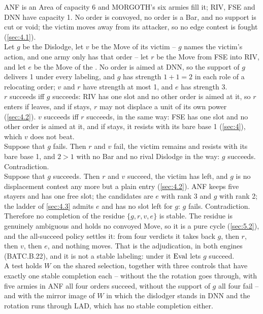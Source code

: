 \documentclass[12pt,a4paper]{article}
\begin{document}
ANF is an Area of capacity 6 and MORGOTH's six armies fill it; RIV, FSE and DNN have capacity 1.
No order is convoyed, no order is a Bar, and no support is cut or void; the victim moves away from its attacker, so no edge contest is fought (\cref{sec:4.1}).\\
Let $g$ be the Dislodge, let $v$ be the Move of its victim -- $g$ names the victim's action, and one army only has that order -- let $r$ be the Move from FSE into RIV, and let $e$ be the Move of the .
No order is aimed at DNN, so the support of $g$ delivers 1 under every labeling, and $g$ has strength $1 + 1 = 2$ in each role of a relocating order; $v$ and $r$ have strength at most 1, and $e$ has strength 3.\\
$r$ succeeds iff $g$ succeeds: RIV has one slot and no other order is aimed at it, so $r$ enters if  leaves, and if  stays, $r$ may not displace a unit of its own power (\cref{sec:4.2}).
$v$ succeeds iff $r$ succeeds, in the same way: FSE has one slot and no other order is aimed at it, and if  stays, it resists with its bare base 1 (\cref{sec:4}), which $v$ does not beat.\\
Suppose that $g$ fails.
Then $r$ and $v$ fail, the victim remains and resists with its bare base 1, and $2 > 1$ with no Bar and no rival Dislodge in the way: $g$ succeeds.
Contradiction.\\
Suppose that $g$ succeeds.
Then $r$ and $v$ succeed, the victim has left, and $g$ is no displacement contest any more but a plain entry (\cref{sec:4.2}).
ANF keeps five stayers and has one free slot; the candidates are $e$ with rank 3 and $g$ with rank 2; the ladder of \cref{sec:4.3} admits $e$ and has no slot left for $g$: $g$ fails.
Contradiction.\\
Therefore no completion of the residue $\{g, r, v, e\}$ is stable.
The residue is genuinely ambiguous and holds no convoyed Move, so it is a pure cycle (\cref{sec:5.2}), and the all-succeed policy settles it: from four verdicts  it takes back $g$, then $r$, then $v$, then $e$, and nothing moves.
That is the adjudication, in both engines (BATC.B.22), and it is not a stable labeling: under it $\operatorname{Eval}$ lets $g$ succeed.\\
A test holds $W$ on the shared selection, together with three controls that have exactly one stable completion each -- without the  the rotation goes through, with five armies in ANF all four orders succeed, without the support of $g$ all four fail -- and with the mirror image of $W$ in which the dislodger stands in DNN and the rotation runs through LAD, which has no stable completion either.
\end{document}
